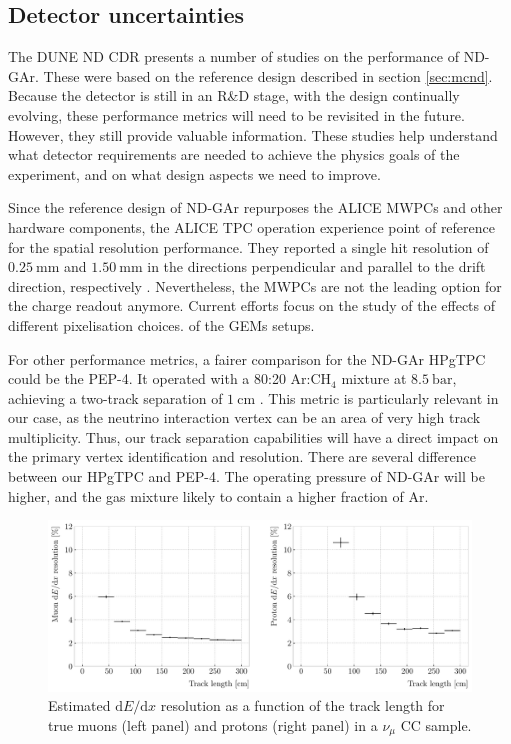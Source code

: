 \subsection{Detector uncertainties}

The DUNE ND CDR \cite{DUNE2021NDCDR} presents a number of studies on the performance of ND-GAr. These were based on the reference design described in section \ref{sec:mcnd}. Because the detector is still in an R\&D stage, with the design continually evolving, these performance metrics will need to be revisited in the future. However, they still provide valuable information. These studies help understand what detector requirements are needed to achieve the physics goals of the experiment, and on what design aspects we need to improve.

Since the reference design of ND-GAr repurposes the ALICE MWPCs and other hardware components, the ALICE TPC operation experience point of reference for the spatial resolution performance. They reported a single hit resolution of $0.25~\mathrm{mm}$ and $1.50~\mathrm{mm}$ in the directions perpendicular and parallel to the drift direction, respectively \cite{ALICE2006}. Nevertheless, the MWPCs are not the leading option for the charge readout anymore. Current efforts focus on the study of the effects of different pixelisation choices. of the GEMs setups.

For other performance metrics, a fairer comparison for the ND-GAr HPgTPC could be the PEP-4. It operated with a 80:20 $\mathrm{Ar}$:$\mathrm{CH}_{4}$ mixture at $8.5~\mathrm{bar}$, achieving a two-track separation of $1~\mathrm{cm}$ \cite{Stork1982,Aihara1983}. This metric is particularly relevant in our case, as the neutrino interaction vertex can be an area of very high track multiplicity. Thus, our track separation capabilities will have a direct impact on the primary vertex identification and resolution. There are several difference between our HPgTPC and PEP-4. The operating pressure of ND-GAr will be higher, and the gas mixture likely to contain a higher fraction of Ar.

\begin{figure}[t]
    \centering
    \includegraphics[width=.90\linewidth]{Images/GAr_selection/length_dEdx_resolution_vs_length.pdf}
    \caption[Estimated $\mathrm{d}E/\mathrm{d}x$ resolution as a function of the track length for true muons and protons in a $\nu_{\mu}$ CC sample.]{Estimated $\mathrm{d}E/\mathrm{d}x$ resolution as a function of the track length for true muons (left panel) and protons (right panel) in a $\nu_{\mu}$ CC sample.}
    \label{fig:dEdx_resolution_vs_length}
\end{figure}

